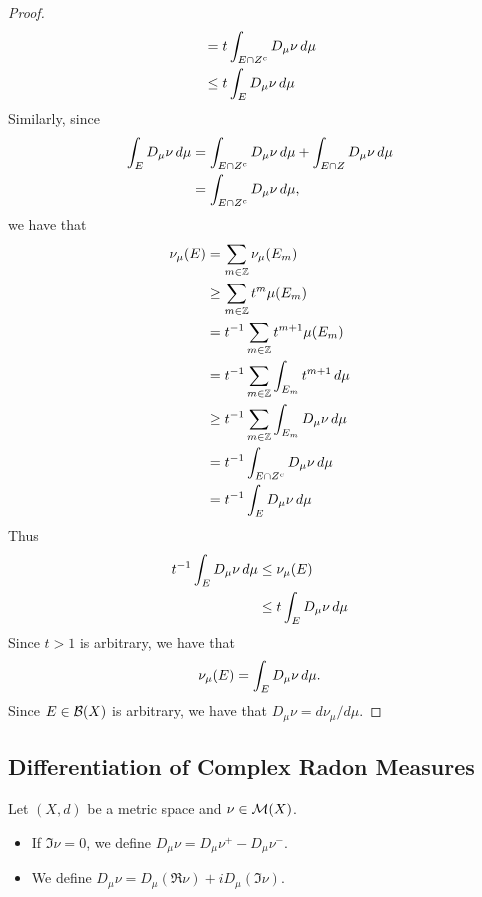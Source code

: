 \documentclass{book}
\begin{document}
\begin{proof}
\begin{align*}
			& = t \int_{E\cap Z^c}  D_{\mu} \nu \, d \mu \\ 
			& \leq t \int_{E}  D_{\mu} \nu \, d \mu 
		\end{align*}
		Similarly, since 
		\begin{align*}
			\int_{E}  D_{\mu} \nu \, d \mu 
			& = \int_{E \cap Z^c} D_{\mu} \nu \, d \mu + \int_{E\cap Z} D_{\mu} \nu \, d \mu  \\
			& = \int_{E \cap Z^c} D_{\mu} \nu \, d \mu,
		\end{align*}
		we have that
		\begin{align*}
			\nu_{\mu}(E)
			& = \sum_{m \in \mathbb{Z}} \nu_{\mu}(E_m) \\
			& \geq \sum_{m \in \mathbb{Z}} t^m \mu(E_m) \\
			& = t^{-1} \sum_{m \in \mathbb{Z}}  t^{m+1} \mu(E_m) \\
			& = t^{-1} \sum_{m \in \mathbb{Z}} \int_{E_m} t^{m+1} \, d \mu \\
			& \geq t^{-1} \sum_{m \in \mathbb{Z}} \int_{E_m} D_{\mu} \nu \, d \mu \\
			& = t^{-1} \int_{E\cap Z^c}  D_{\mu} \nu \, d \mu \\ 
			& = t^{-1} \int_{E}  D_{\mu} \nu \, d \mu 
		\end{align*}
		Thus 
		\begin{align*}
			t^{-1} \int_{E}  D_{\mu} \nu \, d \mu 
			& \leq \nu_{\mu}(E) \\
			& \leq t \int_{E}  D_{\mu} \nu \, d \mu 
		\end{align*}
		Since $t > 1$ is arbitrary, we have that
		$$\nu_{\mu}(E) = \int_{E}  D_{\mu} \nu \, d \mu.$$
		Since $E \in \mathcal{B}(X)$ is arbitrary, we have that $D_{\mu} \nu = d \nu_{\mu}/d \mu$.
	\end{proof}
	
	
	
	
	
	
	
	
	
	
	
	
	
	
	
	
	
	\subsection{Differentiation of Complex Radon Measures}
	
	\begin{defn} 
		Let $(X, d)$ be a metric space and $\nu \in \mathcal{M}(X)$.
		\begin{itemize}
			\item If $\Im \nu = 0$, we define $D_{\mu} \nu = D_{\mu} \nu^+ - D_{\mu} \nu^-$.
			\item We define $D_{\mu} \nu = D_{\mu} (\Re \nu) + i D_{\mu} (\Im \nu)$.
		\end{itemize}
	\end{defn}
\end{document}
